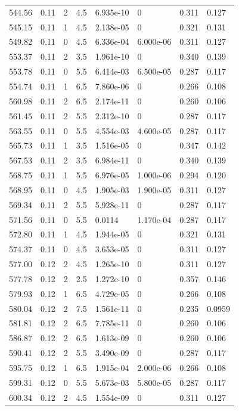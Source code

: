 \documentclass[preview]{standalone}
\begin{document}
{{{{{{\begin{tabular}{L{1.2cm}C{1.2cm} C{0.3cm}C{0.5cm} C{1.4cm}C{1.4cm} C{1.4cm}C{1.4cm}}
  544.56  &  0.11  & 2     & 4.5 &  6.935e-10  & 0  & 0.311 &  0.127   \\ 
  545.15  &  0.11  & 1     & 4.5 &  2.138e-05  & 0  & 0.321 &  0.131   \\ 
  549.82  &  0.11  & 0     & 4.5 &  6.336e-04  & 6.000e-06  & 0.311 &  0.127   \\ 
  553.37  &  0.11  & 2     & 3.5 &  1.961e-10  & 0  & 0.340 &  0.139   \\ 
  553.78  &  0.11  & 0     & 5.5 &  6.414e-03  & 6.500e-05  & 0.287 &  0.117   \\ 
  554.74  &  0.11  & 1     & 6.5 &  7.860e-06  & 0  & 0.266 &  0.108   \\ 
  560.98  &  0.11  & 2     & 6.5 &  2.174e-11  & 0  & 0.260 &  0.106   \\ 
  561.45  &  0.11  & 2     & 5.5 &  2.312e-10  & 0  & 0.287 &  0.117   \\ 
  563.55  &  0.11  & 0     & 5.5 &  4.554e-03  & 4.600e-05  & 0.287 &  0.117   \\ 
  565.73  &  0.11  & 1     & 3.5 &  1.516e-05  & 0  & 0.347 &  0.142   \\ 
  567.53  &  0.11  & 2     & 3.5 &  6.984e-11  & 0  & 0.340 &  0.139   \\ 
  568.75  &  0.11  & 1     & 5.5 &  6.976e-05  & 1.000e-06  & 0.294 &  0.120   \\ 
  568.95  &  0.11  & 0     & 4.5 &  1.905e-03  & 1.900e-05  & 0.311 &  0.127   \\ 
  569.34  &  0.11  & 2     & 5.5 &  5.928e-11  & 0  & 0.287 &  0.117   \\ 
  571.56  &  0.11  & 0     & 5.5 &  0.0114  & 1.170e-04  & 0.287 &  0.117   \\ 
  572.80  &  0.11  & 1     & 4.5 &  1.944e-05  & 0  & 0.321 &  0.131   \\ 
  574.37  &  0.11  & 0     & 4.5 &  3.653e-05  & 0  & 0.311 &  0.127   \\ 
  577.00  &  0.12  & 2     & 4.5 &  1.265e-10  & 0  & 0.311 &  0.127   \\ 
  577.78  &  0.12  & 2     & 2.5 &  1.272e-10  & 0  & 0.357 &  0.146   \\ 
  579.93  &  0.12  & 1     & 6.5 &  4.729e-05  & 0  & 0.266 &  0.108   \\ 
  580.04  &  0.12  & 2     & 7.5 &  1.561e-11  & 0  & 0.235 &  0.0959   \\ 
  581.81  &  0.12  & 2     & 6.5 &  7.785e-11  & 0  & 0.260 &  0.106   \\ 
  586.87  &  0.12  & 2     & 6.5 &  1.613e-09  & 0  & 0.260 &  0.106   \\ 
  590.41  &  0.12  & 2     & 5.5 &  3.490e-09  & 0  & 0.287 &  0.117   \\ 
  595.75  &  0.12  & 1     & 6.5 &  1.915e-04  & 2.000e-06  & 0.266 &  0.108   \\ 
  599.31  &  0.12  & 0     & 5.5 &  5.673e-03  & 5.800e-05  & 0.287 &  0.117   \\ 
  600.34  &  0.12  & 2     & 4.5 &  1.554e-09  & 0  & 0.311 &  0.127   \\ 
\hline 
\end{tabular} 

}}}}}}
\end{document}

